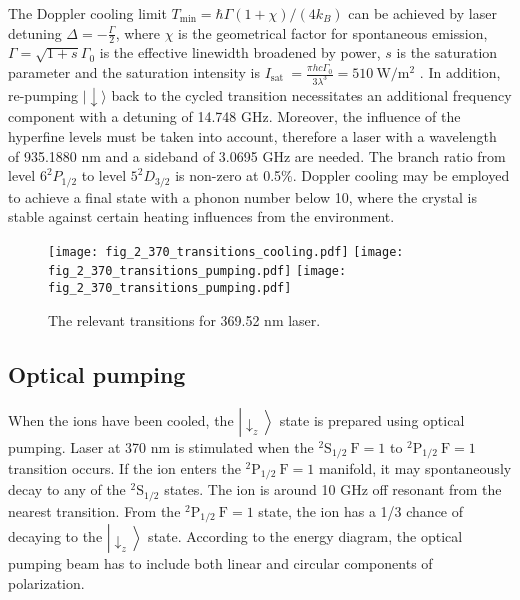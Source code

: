The Doppler cooling limit $T_{\min }=\hbar \Gamma(1+\chi) /\left(4 k_B\right)$ can be achieved by laser detuning $\Delta=-\frac{\Gamma}{2}$, where $\chi$ is the geometrical factor for spontaneous emission, $\Gamma=\sqrt{1+s} \Gamma_0$ is the effective linewidth broadened by power, $s$ is the saturation parameter and the saturation intensity is $I_{\text {sat }}=\frac{\pi h c \Gamma_0}{3 \lambda^3}=510 \mathrm{~W} / \mathrm{m}^2$ \cite{RN201, RN127}. In addition, re-pumping $|\downarrow\rangle$ back to the cycled transition necessitates an additional frequency component with a detuning of 14.748 GHz. Moreover, the influence of the hyperfine levels must be taken into account, therefore a laser with a wavelength of 935.1880 nm and a sideband of 3.0695 GHz are needed. The branch ratio from level $6^2 P_{1 / 2}$ to level $5^2 D_{3 / 2}$ is non-zero at 0.5\%. Doppler cooling may be employed to achieve a final state with a phonon number below 10, where the crystal is stable against certain heating influences from the environment.

\begin{figure}
    \centering
    {\texttt{[image: fig\_2\_370\_transitions\_cooling.pdf]}}
    {\texttt{[image: fig\_2\_370\_transitions\_pumping.pdf]}}
    {\texttt{[image: fig\_2\_370\_transitions\_pumping.pdf]}}
    \caption{The relevant transitions for 369.52 nm laser.}
    \label{fig:370_transitions}
\end{figure}

\subsection{Optical pumping}

When the ions have been cooled, the $\left|\downarrow_z\right\rangle$ state is prepared using optical pumping. Laser at 370 nm is stimulated when the ${ }^2 \mathrm{S}_{1 / 2} \mathrm{~F}=1$ to ${ }^2 \mathrm{P}_{1 / 2} \mathrm{~F}=1$ transition occurs. If the ion enters the ${ }^2 \mathrm{P}_{1 / 2} \mathrm{~F}=1$ manifold, it may spontaneously decay to any of the ${ }^2 \mathrm{S}_{1 / 2}$ states. The ion is around 10 GHz off resonant from the nearest transition. From the ${ }^2 \mathrm{P}_{1 / 2} \mathrm{~F}=1$ state, the ion has a 1/3 chance of decaying to the $\left|\downarrow_z\right\rangle$ state. According to the energy diagram, the optical pumping beam has to include both linear and circular components of polarization.

